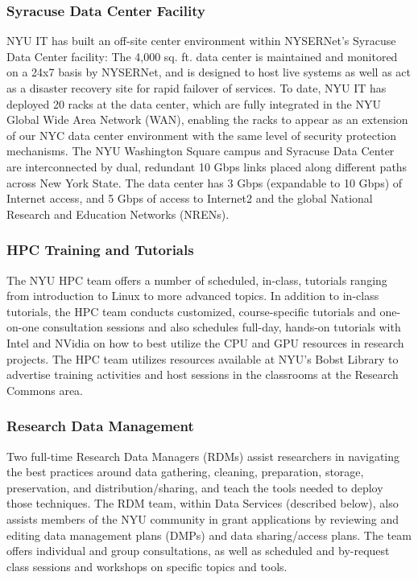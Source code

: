 \subsubsection*{Syracuse Data Center Facility}
NYU IT has built an off-site center environment within NYSERNet's Syracuse Data Center facility: The 4,000 sq. ft. data center is maintained and monitored on a 24x7 basis by NYSERNet, and is designed to host live systems as well as act as a disaster recovery site for rapid failover of services.  To date, NYU IT has deployed 20 racks at the data center, which are fully integrated in the NYU Global Wide Area Network (WAN), enabling the racks to appear as an extension of our NYC data center environment with the same level of security protection mechanisms. The NYU Washington Square campus and Syracuse Data Center are interconnected by dual, redundant 10 Gbps links placed along different paths across New York State.  The data center has 3 Gbps (expandable to 10 Gbps) of Internet access, and 5 Gbps of access to Internet2 and the global National Research and Education Networks (NRENs).

\subsubsection*{HPC Training and Tutorials}
The NYU HPC team offers a number of scheduled, in-class, tutorials ranging from introduction to Linux to more advanced topics. In addition to in-class tutorials, the HPC team conducts customized, course-specific tutorials and one-on-one consultation sessions and also schedules full-day, hands-on tutorials with Intel and NVidia on how to best utilize the CPU and GPU resources in research projects. The HPC team utilizes resources available at NYU’s Bobst Library to advertise training activities and host sessions in the classrooms at the Research Commons area.

\subsubsection*{Research Data Management}
Two full-time Research Data Managers (RDMs) assist researchers in navigating the best practices around data gathering, cleaning, preparation, storage, preservation, and distribution/sharing, and teach the tools needed to deploy those techniques. The RDM team, within Data Services (described below), also assists members of the NYU community in grant applications by reviewing and editing data management plans (DMPs) and data sharing/access plans. The team offers individual and group consultations, as well as scheduled and by-request class sessions and workshops on specific topics and tools.

